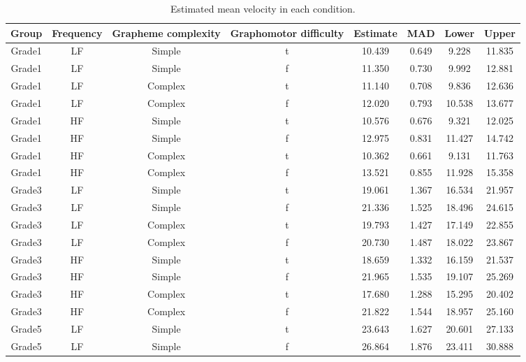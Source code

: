 \documentclass[
  11pt,
  english,
  ,doc,floatsintext]{apa6}
\begin{document}
\begin{table}[htb]

\begin{center}
\begin{threeparttable}

\caption{\label{tab:velocity-predictions-summary}Estimated mean velocity in each condition.}

\scriptsize{

\begin{tabular}{cccccccc}
\toprule
Group & \multicolumn{1}{c}{Frequency} & \multicolumn{1}{c}{Grapheme complexity} & \multicolumn{1}{c}{Graphomotor difficulty} & \multicolumn{1}{c}{Estimate} & \multicolumn{1}{c}{MAD} & \multicolumn{1}{c}{Lower} & \multicolumn{1}{c}{Upper}\\
\midrule
Grade1 & LF & Simple & t & 10.439 & 0.649 & 9.228 & 11.835\\
Grade1 & LF & Simple & f & 11.350 & 0.730 & 9.992 & 12.881\\
Grade1 & LF & Complex & t & 11.140 & 0.708 & 9.836 & 12.636\\
Grade1 & LF & Complex & f & 12.020 & 0.793 & 10.538 & 13.677\\
Grade1 & HF & Simple & t & 10.576 & 0.676 & 9.321 & 12.025\\
Grade1 & HF & Simple & f & 12.975 & 0.831 & 11.427 & 14.742\\
Grade1 & HF & Complex & t & 10.362 & 0.661 & 9.131 & 11.763\\
Grade1 & HF & Complex & f & 13.521 & 0.855 & 11.928 & 15.358\\
Grade3 & LF & Simple & t & 19.061 & 1.367 & 16.534 & 21.957\\
Grade3 & LF & Simple & f & 21.336 & 1.525 & 18.496 & 24.615\\
Grade3 & LF & Complex & t & 19.793 & 1.427 & 17.149 & 22.855\\
Grade3 & LF & Complex & f & 20.730 & 1.487 & 18.022 & 23.867\\
Grade3 & HF & Simple & t & 18.659 & 1.332 & 16.159 & 21.537\\
Grade3 & HF & Simple & f & 21.965 & 1.535 & 19.107 & 25.269\\
Grade3 & HF & Complex & t & 17.680 & 1.288 & 15.295 & 20.402\\
Grade3 & HF & Complex & f & 21.822 & 1.544 & 18.957 & 25.160\\
Grade5 & LF & Simple & t & 23.643 & 1.627 & 20.601 & 27.133\\
Grade5 & LF & Simple & f & 26.864 & 1.876 & 23.411 & 30.888\\

\end{tabular}}
\end{threeparttable}
\end{center}
\end{table}
\end{document}
